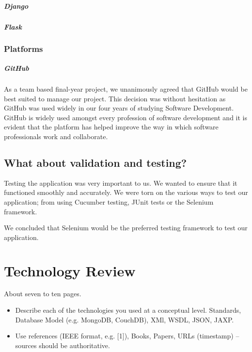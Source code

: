 \paragraph{Django}


\paragraph{Flask}


\subsection{Platforms}
\paragraph{GitHub}
As a team based final-year project, we unanimously agreed that GitHub\cite{github} would be best suited to manage our project. This decision was without hesitation as GitHub was used widely in our four years of studying Software Development. GitHub is widely used amongst every profession of software development and it is evident that the platform has helped improve the way in which software professionals work and collaborate\cite{zagalsky2015emergence}.

\section{What about validation and testing?}
Testing the application was very important to us. We wanted to ensure that it functioned smoothly and accurately. We were torn on the various ways to test our application; from using Cucumber testing, JUnit tests or the Selenium framework.

We concluded that Selenium would be the preferred testing framework to test our application.


\chapter{Technology Review}
About seven to ten pages.
\begin{itemize}
\item Describe each of the technologies you used at a conceptual level. Standards, Database Model (e.g. MongoDB, CouchDB), XMl, WSDL, JSON, JAXP.
\item Use references (IEEE format, e.g. [1]), Books, Papers, URLs (timestamp) – sources should be authoritative. 
\end{itemize}

